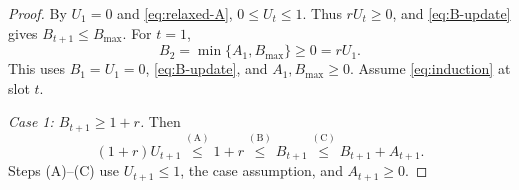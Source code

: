 \begin{proof}
By $U_1=0$ and \eqref{eq:relaxed-A}, $0\leq U_t\leq1$.
Thus $rU_t\geq0$, and \eqref{eq:B-update} gives $B_{t+1}\leq B_{\mathrm{max}}$.
For $t=1$,
\begin{equation}\label{eq:energy:reserve-base}
 B_2=\min\{A_1,B_{\mathrm{max}}\}\geq0=rU_1.
\end{equation}
This uses $B_1=U_1=0$, \eqref{eq:B-update}, and $A_1,B_{\mathrm{max}}\geq0$.
Assume \eqref{eq:induction} at slot $t$.

\emph{Case 1: $B_{t+1}\geq1+r$.} Then
\begin{equation}\label{eq:energy:reserve-high}
 (1+r)U_{t+1}
 \overset{\mathrm{(A)}}{\leq}1+r
 \overset{\mathrm{(B)}}{\leq}B_{t+1}
 \overset{\mathrm{(C)}}{\leq}B_{t+1}+A_{t+1}.
\end{equation}
Steps (A)--(C) use $U_{t+1}\leq1$, the case assumption, and $A_{t+1}\geq0$.


\end{proof}
